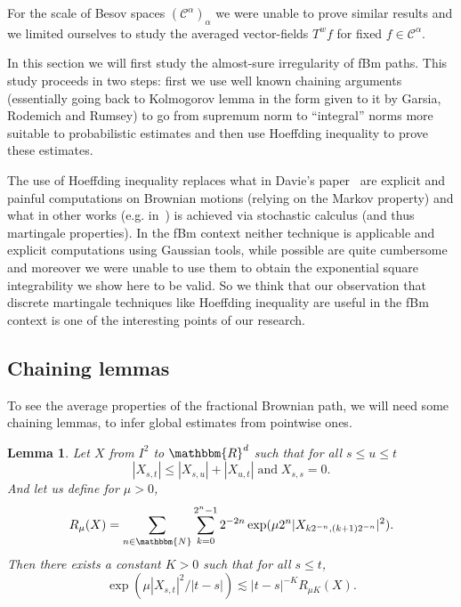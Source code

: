 \documentclass[a4paper,11pt]{article}
\newcommand{\tmop}[1]{\ensuremath{\operatorname{#1}}}
\newtheorem{lemma}[theorem]{Lemma}
\newcommand{\CC}{\mathscr C}
\begin{document}
For the scale of Besov spaces $\left( \CC^{\alpha} \right)_{\alpha}$ we were
unable to prove similar results and we limited ourselves to study the averaged
vector-fields $T^{w} f$ for fixed $f \in \CC^{\alpha}$.

In this section we will first study the almost-sure irregularity of fBm paths.
This study proceeds in two steps: first we use well known chaining arguments
(essentially going back to Kolmogorov lemma in the form given to it by
Garsia, Rodemich and Rumsey) to go from supremum norm to ``integral'' norms
more suitable to probabilistic estimates and then use Hoeffding inequality to
prove these estimates.

The use of Hoeffding inequality replaces what in Davie's paper~{\cite{MR2377011}} are
explicit and painful computations on Brownian motions (relying on the Markov
property) and what in other works (e.g. in~{\cite{FGP}}) is achieved via
stochastic calculus (and thus martingale properties). In the fBm context
neither technique is applicable and explicit computations using Gaussian
tools, while possible are quite cumbersome and moreover we were unable to use
them to obtain the exponential square integrability we show here to be valid.
So we think that our observation that discrete martingale techniques like
Hoeffding inequality are useful in the fBm context is one of the interesting
points of our research.

\subsection{Chaining lemmas}

To see the average properties of the fractional Brownian path, we will need
some chaining lemmas, to infer global estimates from pointwise ones.

\begin{lemma}
  \label{lemma_chaining_time}Let $X$ from $I^{2}$ to $\mathbbm{R}^{d}$ such
  that for all $s \leqslant u \leqslant t$
  \[ | X_{s,t} | \leqslant | X_{s,u} | + | X_{u,t} |   \tmop{and}  X_{s,s} =0.
  \]
  And let us define for $\mu>0$,
  \[ R_{\mu} ( X ) = \sum_{n \in \mathbbm{N}} \sum_{k=0}^{2^{n} -1} 2^{-2n}
     \exp ( \mu 2^{n} | X_{k2^{-n} , ( k+1 ) 2^{-n}} |^{2} ). \]
  Then there exists a constant $K>0$ such that for all $s \leqslant t$,
  \[ \exp ( \mu | X_{s,t} |^{2} / | t-s | ) \lesssim | t-s |^{-K} R_{\mu K} (
     X ). \]
\end{lemma}
\end{document}
